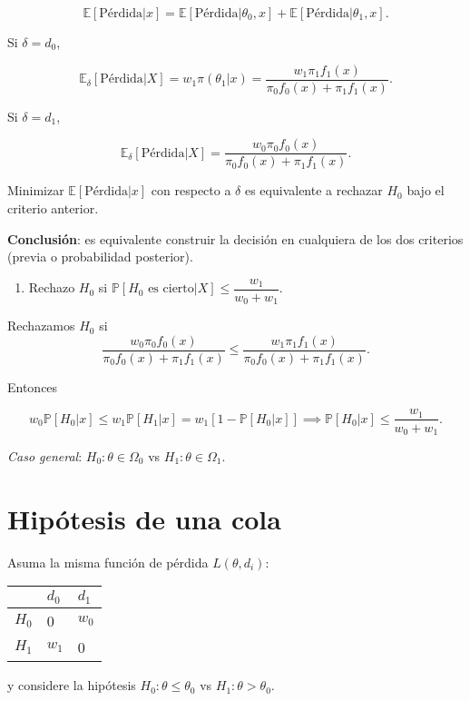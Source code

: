 \documentclass[
  12pt,
]{book}
\providecommand{\tightlist}{%
  \setlength{\itemsep}{0pt}\setlength{\parskip}{0pt}}
\begin{document}
\[\mathbb E[\text{Pérdida}|x] = \mathbb E[\text{Pérdida}|\theta_0,x] + \mathbb E[\text{Pérdida}|\theta_1,x].\]

Si \(\delta = d_0\),

\[\mathbb E_\delta[\text{Pérdida}|X] = w_1\pi(\theta_1|x) =  \dfrac{w_1\pi_1f_1(x)}{\pi_0f_0(x)+\pi_1f_1(x)}. \]

Si \(\delta = d_1\),

\[\mathbb E_\delta[\text{Pérdida}|X] = \dfrac{w_0\pi_0f_0(x)}{\pi_0f_0(x)+\pi_1f_1(x)}. \]

Minimizar \(\mathbb E[\text{Pérdida}|x]\) con respecto a \(\delta\) es equivalente a rechazar \(H_0\) bajo el criterio anterior.

\textbf{Conclusión}: es equivalente construir la decisión en cualquiera de los dos criterios (previa o probabilidad posterior).

\begin{enumerate}
\def\labelenumi{\alph{enumi}.}
\setcounter{enumi}{2}
\tightlist
\item
  Rechazo \(H_0\) si \(\mathbb P[H_0 \text{ es cierto}|X] \leq \dfrac{w_1}{w_0+w_1}.\)
\end{enumerate}

Rechazamos \(H_0\) si
\[\dfrac{w_0\pi_0f_0(x)}{\pi_0f_0(x)+\pi_1f_1(x)}\leq \dfrac{w_1\pi_1f_1(x)}{\pi_0f_0(x)+\pi_1f_1(x)}.\]

Entonces

\[w_0\mathbb P[H_0|x] \leq w_1\mathbb P[H_1|x] = w_1[1-\mathbb P[H_0|x]] \implies\mathbb P[H_0|x]\leq \dfrac{w_1}{w_0+w_1}. \]

\emph{Caso general}: \(H_0: \theta \in \Omega_0\) vs \(H_1: \theta \in \Omega_1\).

\hypertarget{hipuxf3tesis-de-una-cola}{%
\section{Hipótesis de una cola}\label{hipuxf3tesis-de-una-cola}}

Asuma la misma función de pérdida \(L(\theta,d_i)\):

\begin{longtable}[]{@{}lll@{}}
\toprule
& \(d_0\) & \(d_1\)\tabularnewline
\midrule
\endhead
\(H_0\) & 0 & \(w_0\)\tabularnewline
\(H_1\) & \(w_1\) & 0\tabularnewline
\bottomrule
\end{longtable}

y considere la hipótesis \(H_0: \theta \leq \theta_0\) vs \(H_1: \theta > \theta_0\).
\end{document}
